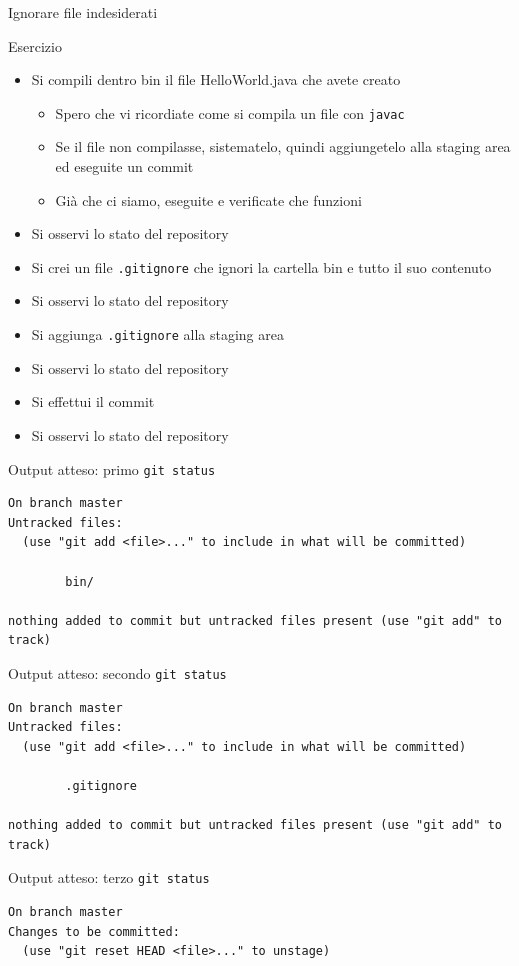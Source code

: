 \documentclass[presentation]{beamer}
\begin{document}
\begin{frame}{Ignorare file indesiderati}
	\begin{block}{Esercizio}	
		\begin{itemize}
			\item Si compili dentro bin il file HelloWorld.java che avete creato
			\begin{itemize}
				\item Spero che vi ricordiate come si compila un file con \texttt{javac}
				\item Se il file non compilasse, sistematelo, quindi aggiungetelo alla staging area ed eseguite un commit
				\item Già che ci siamo, eseguite e verificate che funzioni
			\end{itemize}
			\item Si osservi lo stato del repository
			\item Si crei un file \texttt{.gitignore} che ignori la cartella bin e tutto il suo contenuto
			\item Si osservi lo stato del repository
			\item Si aggiunga \texttt{.gitignore} alla staging area
			\item Si osservi lo stato del repository
			\item Si effettui il commit
			\item Si osservi lo stato del repository
		\end{itemize}
	\end{block}
	\begin{block}{Output atteso: primo \texttt{git status}}
		\begin{Verbatim}[fontsize=\scriptsize]
On branch master
Untracked files:
  (use "git add <file>..." to include in what will be committed)

        bin/

nothing added to commit but untracked files present (use "git add" to track)
		\end{Verbatim}
	\end{block}
	\begin{block}{Output atteso: secondo \texttt{git status}}
		\begin{Verbatim}[fontsize=\scriptsize]
On branch master
Untracked files:
  (use "git add <file>..." to include in what will be committed)

        .gitignore

nothing added to commit but untracked files present (use "git add" to track)
		\end{Verbatim}
	\end{block}
	\begin{block}{Output atteso: terzo \texttt{git status}}
		\begin{Verbatim}[fontsize=\scriptsize]
On branch master
Changes to be committed:
  (use "git reset HEAD <file>..." to unstage)


\end{Verbatim}
\end{block}
\end{frame}
\end{document}
